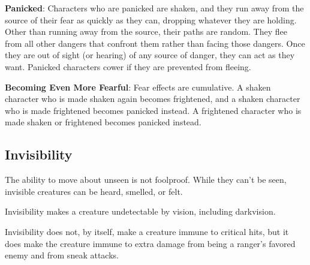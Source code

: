 \textbf{Panicked}: Characters who are panicked are shaken, and they run away from the source of their fear as quickly as they can, dropping whatever they are holding. Other than running away from the source, their paths are random. They flee from all other dangers that confront them rather than facing those dangers. Once they are out of sight (or hearing) of any source of danger, they can act as they want. Panicked characters cower if they are prevented from fleeing.
				
\textbf{Becoming Even More Fearful}: Fear effects are cumulative. A shaken character who is made shaken again becomes frightened, and a shaken character who is made frightened becomes panicked instead. A frightened character who is made shaken or frightened becomes panicked instead.
				
\subsection{Invisibility}

				
The ability to move about unseen is not foolproof. While they can't be seen, invisible creatures can be heard, smelled, or felt. 
				
Invisibility makes a creature undetectable by vision, including darkvision.
				
Invisibility does not, by itself, make a creature immune to critical hits, but it does make the creature immune to extra damage from being a ranger's favored enemy and from sneak attacks.
				

